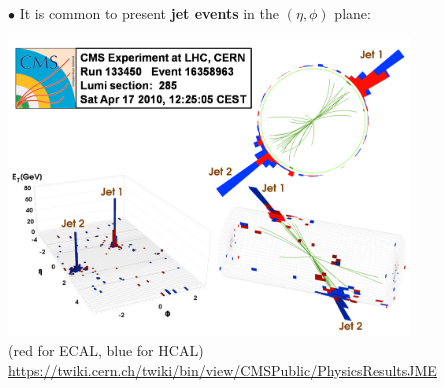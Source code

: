 \documentclass[9pt,a4paper,unknownkeysallowed,xcolor=dvipsnames,aspectratio=43]{beamer}
\begin{document}
%
%
\begin{frame}

{\color{darkred}\Large$\bullet$} It is common to present {\bf jet events} in the $(\eta, \phi)$ plane:
\begin{center}
\includegraphics[width=0.8\textwidth]{lego.png}\\
\vspace{1mm}
{\small({\color{red}red for ECAL}, {\color{blue}blue for HCAL})}\\
\vspace{1mm}
{\tiny
\href{https://twiki.cern.ch/twiki/bin/view/CMSPublic/PhysicsResultsJME}{https://twiki.cern.ch/twiki/bin/view/CMSPublic/PhysicsResultsJME}
}
\end{center}
\end{frame}
%
%
\end{document}
